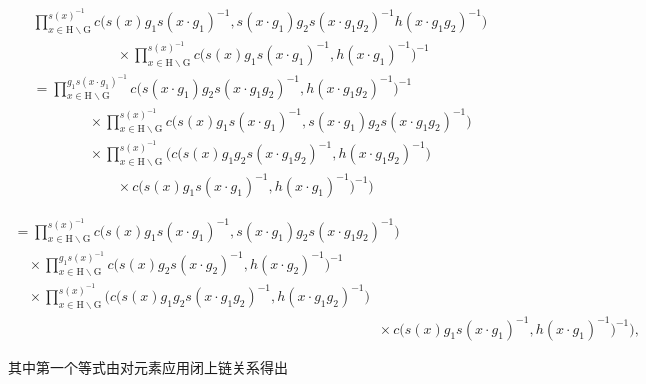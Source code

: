 \[
\begin{array}{l} \prod_ {x \in \mathrm{H} \backslash \mathrm{G}} ^ {s (x) ^ {- 1}} c \big (s (x) g _ {1} s (x \cdot g _ {1}) ^ {- 1}, s (x \cdot g _ {1}) g _ {2} s (x \cdot g _ {1} g _ {2}) ^ {- 1} h (x \cdot g _ {1} g _ {2}) ^ {- 1} \big) \\ \qquad \qquad \qquad \times \prod_ {x \in \mathrm{H} \backslash \mathrm{G}} ^ {s (x) ^ {- 1}} c \big (s (x) g _ {1} s (x \cdot g _ {1}) ^ {- 1}, h (x \cdot g _ {1}) ^ {- 1} \big) ^ {- 1} \\ = \prod_ {x \in \mathrm{H} \backslash \mathrm{G}} ^ {g _ {1} s (x \cdot g _ {1}) ^ {- 1}} c \big (s (x \cdot g _ {1}) g _ {2} s (x \cdot g _ {1} g _ {2}) ^ {- 1}, h (x \cdot g _ {1} g _ {2}) ^ {- 1} \big) ^ {- 1} \\ \qquad \qquad \times \prod_ {x \in \mathrm{H} \backslash \mathrm{G}} ^ {s (x) ^ {- 1}} c \big (s (x) g _ {1} s (x \cdot g _ {1}) ^ {- 1}, s (x \cdot g _ {1}) g _ {2} s (x \cdot g _ {1} g _ {2}) ^ {- 1} \big) \\ \qquad \qquad \times \prod_ {x \in \mathrm{H} \backslash \mathrm{G}} ^ {s (x) ^ {- 1}} \Big (c \big (s (x) g _ {1} g _ {2} s (x \cdot g _ {1} g _ {2}) ^ {- 1}, h (x \cdot g _ {1} g _ {2}) ^ {- 1} \big) \\ \qquad \qquad \qquad \times c \big (s (x) g _ {1} s (x \cdot g _ {1}) ^ {- 1}, h (x \cdot g _ {1}) ^ {- 1} \big) ^ {- 1} \Big) \end{array}
\]

\[
\begin{array}{l} = \prod_ {x \in \mathrm{H} \backslash \mathrm{G}} ^ {s (x) ^ {- 1}} c \big (s (x) g _ {1} s (x \cdot g _ {1}) ^ {- 1}, s (x \cdot g _ {1}) g _ {2} s (x \cdot g _ {1} g _ {2}) ^ {- 1} \big) \\ \quad \times \prod_ {x \in \mathrm{H} \backslash \mathrm{G}} ^ {g _ {1} s (x) ^ {- 1}} c \big (s (x) g _ {2} s (x \cdot g _ {2}) ^ {- 1}, h (x \cdot g _ {2}) ^ {- 1} \big) ^ {- 1} \\ \quad \times \prod_ {x \in \mathrm{H} \backslash \mathrm{G}} ^ {s (x) ^ {- 1}} \Big (c \big (s (x) g _ {1} g _ {2} s (x \cdot g _ {1} g _ {2}) ^ {- 1}, h (x \cdot g _ {1} g _ {2}) ^ {- 1} \big) \\ \qquad \qquad \qquad \qquad \qquad \qquad \qquad \qquad \qquad \qquad \qquad \qquad \qquad \times c \big (s (x) g _ {1} s (x \cdot g _ {1}) ^ {- 1}, h (x \cdot g _ {1}) ^ {- 1} \big) ^ {- 1} \Big), \end{array}
\]

其中第一个等式由对元素应用闭上链关系得出

